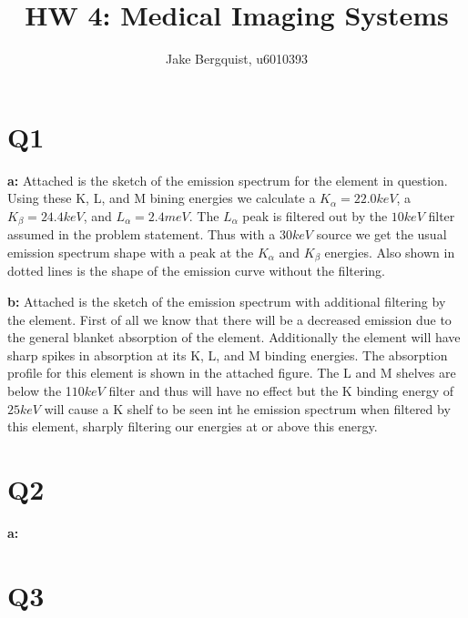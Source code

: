 \documentclass[12pt]{article}
\begin{document}
\title{HW 4: Medical Imaging Systems}
\author{Jake Bergquist, u6010393 }
\maketitle

\section{Q1}
\noindent\textbf{a: } Attached is the sketch of the emission spectrum for the element in question. Using these K, L, and M bining energies we calculate a $K_\alpha = 22.0 keV$, a $K_\beta = 24.4 keV$, and $L_\alpha = 2.4 meV$. The $L_\alpha$ peak is filtered out by the $10 keV$ filter assumed in the problem statement. Thus with a $30 keV$ source we get the usual emission spectrum shape with a peak at the $K_\alpha$ and $K_\beta$ energies. Also shown in dotted lines is the shape of the emission curve without the filtering.

\noindent\textbf{b: } Attached is the sketch of the emission spectrum with additional filtering by the element. First of all we know that there will be a decreased emission due to the general blanket absorption of the element. Additionally the element will have sharp spikes in absorption at its K, L, and M binding energies. The absorption profile for this element is shown in the attached figure. The L and M shelves are below the 1$10keV$ filter and thus will have no effect but the K binding energy of $25 keV$ will cause a K shelf to be seen int he emission spectrum when filtered by this element, sharply filtering our energies at or above this energy.

\section{Q2}
\noindent\textbf{a: } 




\section{Q3}
\end{document}
